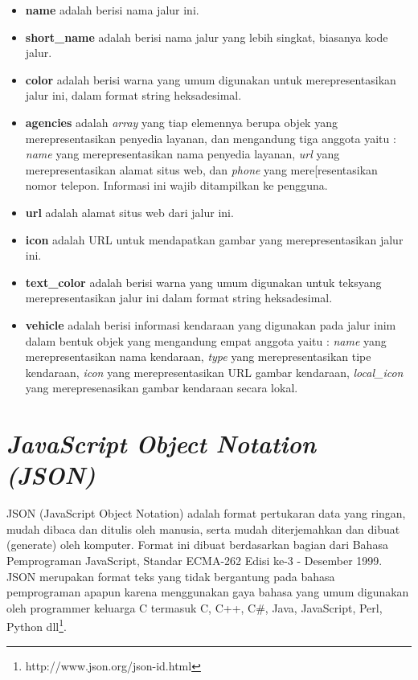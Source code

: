 \begin{itemize}
	\item \textbf{name} adalah berisi nama jalur ini.
	\item \textbf{short\_name} adalah berisi nama jalur yang lebih singkat, biasanya kode jalur.
	\item \textbf{color} adalah berisi warna yang umum digunakan untuk merepresentasikan jalur ini, dalam format string heksadesimal.
	\item \textbf{agencies} adalah \textit{array} yang tiap elemennya berupa objek yang merepresentasikan penyedia layanan, dan mengandung tiga anggota yaitu : \textit{name} yang merepresentasikan nama penyedia layanan, \textit{url} yang merepresentasikan alamat situs web, dan \textit{phone} yang mere[resentasikan nomor telepon. Informasi ini wajib ditampilkan ke pengguna.
	\item \textbf{url} adalah alamat situs web dari jalur ini.
	\item \textbf{icon} adalah URL untuk mendapatkan gambar yang merepresentasikan jalur ini.
	\item \textbf{text\_color} adalah berisi warna yang umum digunakan untuk teksyang merepresentasikan jalur ini dalam format string heksadesimal.
	\item \textbf{vehicle} adalah berisi informasi kendaraan yang digunakan pada jalur inim dalam bentuk objek yang mengandung empat anggota yaitu : \textit{name} yang merepresentasikan nama kendaraan, \textit{type} yang merepresentasikan tipe kendaraan, \textit{icon} yang merepresentasikan URL gambar kendaraan, \textit{local\_icon} yang merepresenasikan gambar kendaraan secara lokal.
\end{itemize}

\section{\textit{JavaScript Object Notation (JSON)}}
\label{sec:json}
JSON (JavaScript Object Notation) adalah format pertukaran data yang ringan, mudah dibaca dan ditulis oleh manusia, serta mudah diterjemahkan dan dibuat (generate) oleh komputer. Format ini dibuat berdasarkan bagian dari Bahasa Pemprograman JavaScript, Standar ECMA-262 Edisi ke-3 - Desember 1999. JSON merupakan format teks yang tidak bergantung pada bahasa pemprograman apapun karena menggunakan gaya bahasa yang umum digunakan oleh programmer keluarga C termasuk C, C++, C\#, Java, JavaScript, Perl, Python dll\footnote{http://www.json.org/json-id.html}.

